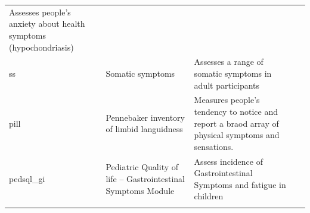 \documentclass[]{book}
\begin{document}
\begin{longtable}[]{@{}llll@{}}
\begin{minipage}[t]{0.22\columnwidth}
Assesses people's anxiety about health symptoms (hypochondriasis)\strut
\end{minipage} & \begin{minipage}[t]{0.18\columnwidth}\raggedright
\strut
\end{minipage}\tabularnewline
\begin{minipage}[t]{0.22\columnwidth}\raggedright
ss\strut
\end{minipage} & \begin{minipage}[t]{0.27\columnwidth}\raggedright
Somatic symptoms\strut
\end{minipage} & \begin{minipage}[t]{0.22\columnwidth}\raggedright
Assesses a range of somatic symptoms in adult participants\strut
\end{minipage} & \begin{minipage}[t]{0.18\columnwidth}\raggedright
\strut
\end{minipage}\tabularnewline
\begin{minipage}[t]{0.22\columnwidth}\raggedright
pill\strut
\end{minipage} & \begin{minipage}[t]{0.27\columnwidth}\raggedright
Pennebaker inventory of limbid languidness\strut
\end{minipage} & \begin{minipage}[t]{0.22\columnwidth}\raggedright
Measures people's tendency to notice and report a braod array of physical symptoms and sensations.\strut
\end{minipage} & \begin{minipage}[t]{0.18\columnwidth}\raggedright
\strut
\end{minipage}\tabularnewline
\begin{minipage}[t]{0.22\columnwidth}\raggedright
pedsql\_gi\strut
\end{minipage} & \begin{minipage}[t]{0.27\columnwidth}\raggedright
Pediatric Quality of life -- Gastrointestinal Symptoms Module\strut
\end{minipage} & \begin{minipage}[t]{0.22\columnwidth}\raggedright
Assess incidence of Gastrointestinal Symptoms and fatigue in children\strut
\end{minipage} & \begin{minipage}[t]{0.18\columnwidth}\raggedright
\strut
\end{minipage}\tabularnewline
\begin{minipage}[t]{0.22\columnwidth}\raggedright

\end{minipage}
\end{longtable}
\end{document}
